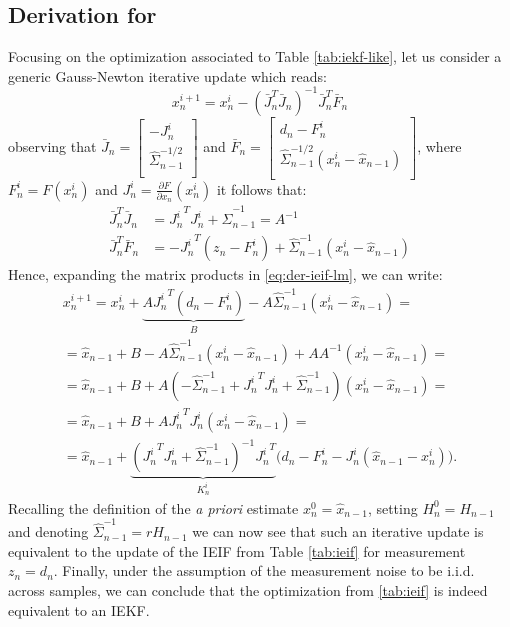 \subsection{Derivation for }
\label{app:ieif-lm}
%
Focusing on the optimization associated to Table \ref{tab:iekf-like}, let us consider a generic Gauss-Newton iterative update which reads:
% 
\begin{equation}
\label{eq:der-ieif-lm}
    x_n^{i + 1}= x_n^{i} - (\bar{J}_n^T \bar{J}_n)^{-1} \bar{J}_n^T \bar{F}_n 
\end{equation}
 observing that $\bar{J}_n = \left[
 \begin{array}{c}
 	- J_n^i \\
\hat{\Sigma}_{n-1}^{-1/2} \\
 \end{array}
 \right]  $ and $\bar{F}_n = \left[
 \begin{array}{c}
 d_n - F_n^i \\
\hat{\Sigma}_{n-1}^{-1/2} (x_n^i - \hat{x}_{n - 1}) \\
 \end{array}
 \right]$, where  $F_n^i = F(x_n^i)$ and
 $J_n^i = \frac{\partial F}{\partial x_n}(x_n^i)$ it follows that:
\begin{align*}
\bar{J}_n^T \bar{J}_n &= {J_n^i}^T J_n^i +\hat{\Sigma}_{n-1}^{-1} = A^{-1} \\
\bar{J}_n^T \bar{F}_n  &=  	- {J_n^i}^T(z_n - F_n^i) + \hat{\Sigma}_{n-1}^{-1}(x_n^i - \hat{x}_{n - 1})
 \end{align*}
Hence, expanding the matrix products in \eqref{eq:der-ieif-lm}, we can write:
 \begin{align*}
x_n^{i + 1} 
= x_n^i +\underbrace{A {J_n^i}^T(d_n - F_n^i)}_B - A \hat{\Sigma}_{n-1}^{-1}(x_n^i - \hat{x}_{n - 1})  = \\
= \hat{x}_{n - 1} + B  - A \hat{\Sigma}_{n-1}^{-1}(x_n^i - \hat{x}_{n - 1}) + A A^{-1}( x_n^i - \hat{x}_{n - 1}) = \\
= \hat{x}_{n - 1} + B + A(- \hat{\Sigma}_{n-1}^{-1} + {J_n^i}^T J_n^i + \hat{\Sigma}_{n-1}^{-1})(x_n^i - \hat{x}_{n - 1}) = \\
= \hat{x}_{n - 1} + B + A {J_n^i}^T J_n^i (x_n^i - \hat{x}_{n - 1}) = \\
= \hat{x}_{n - 1} + \underbrace{\left({J_n^i}^T J_n^i + \hat{\Sigma}_{n-1}^{-1}\right)^{-1} {J_n^i}^T}_{K_n^i}  \big(d_n - F_n^i - J_n^i (\hat{x}_{n - 1} - x_n^i)\big).
\end{align*}
% 
Recalling the definition of the \textit{a priori} estimate $x_n^0 = \hat{x}_{n - 1}$, setting $H_n^0 = H_{n-1}$ and denoting $\hat{\Sigma}_{n-1}^{-1} = r H_{n - 1}$ we can now see that such an iterative update is equivalent to the update of the IEIF from Table \ref{tab:ieif} for measurement $z_n = d_n$. Finally, under  the assumption of the measurement noise to be i.i.d. across samples, we can conclude that the optimization from \ref{tab:ieif} is indeed equivalent to an IEKF.


% 